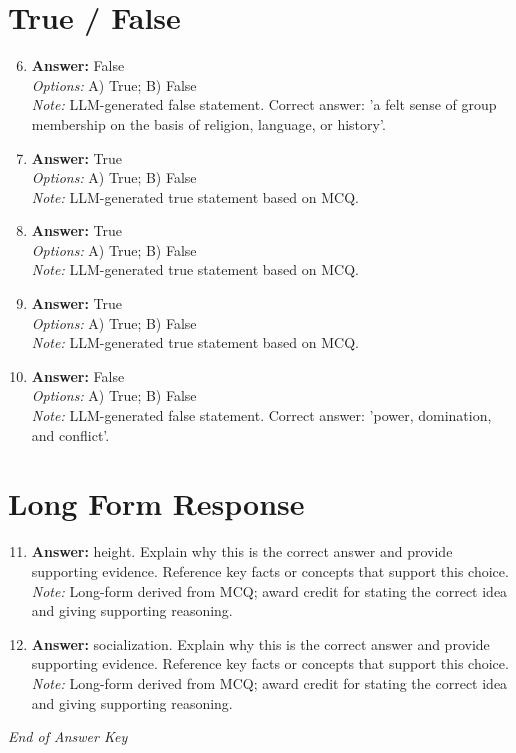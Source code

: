 \documentclass[12pt]{article}
\begin{document}
\section*{True / False}
\begin{enumerate}[label=\arabic*.]
\setcounter{enumi}{5}
\item \textbf{Answer:} False
\\ \textit{Options:} A) True; B) False
\\ \textit{Note:} LLM-generated false statement. Correct answer: 'a felt sense of group membership on the basis of religion, language, or history'.
\item \textbf{Answer:} True
\\ \textit{Options:} A) True; B) False
\\ \textit{Note:} LLM-generated true statement based on MCQ.
\item \textbf{Answer:} True
\\ \textit{Options:} A) True; B) False
\\ \textit{Note:} LLM-generated true statement based on MCQ.
\item \textbf{Answer:} True
\\ \textit{Options:} A) True; B) False
\\ \textit{Note:} LLM-generated true statement based on MCQ.
\item \textbf{Answer:} False
\\ \textit{Options:} A) True; B) False
\\ \textit{Note:} LLM-generated false statement. Correct answer: 'power, domination, and conflict'.
\end{enumerate}

\section*{Long Form Response}
\begin{enumerate}[label=\arabic*.]
\setcounter{enumi}{10}
\item \textbf{Answer:} height. Explain why this is the correct answer and provide supporting evidence. Reference key facts or concepts that support this choice.
\\ \textit{Note:} Long-form derived from MCQ; award credit for stating the correct idea and giving supporting reasoning.
\item \textbf{Answer:} socialization. Explain why this is the correct answer and provide supporting evidence. Reference key facts or concepts that support this choice.
\\ \textit{Note:} Long-form derived from MCQ; award credit for stating the correct idea and giving supporting reasoning.
\end{enumerate}

\vfill
\noindent\textit{End of Answer Key}
\end{document}
